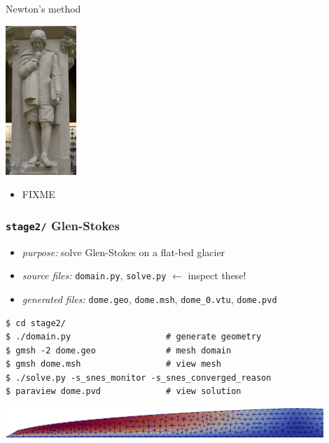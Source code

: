 \documentclass[10pt,hyperref,dvipsnames]{beamer}
\begin{document}
\begin{frame}{Newton's method}

\hfill \includegraphics[width=0.2\textwidth]{figs/people/inewton.jpg}

\vspace{-20mm}
\begin{itemize}
\item FIXME
\end{itemize}
\end{frame}


\begin{frame}[fragile]
\frametitle{\texttt{stage2/} \qquad Glen-Stokes}

\begin{itemize}
\item \emph{purpose:} solve Glen-Stokes on a flat-bed glacier
\item \emph{source files:} \texttt{domain.py}, \texttt{solve.py} \hfill \alert{$\gets$ inspect these!}
\item \emph{generated files:} \texttt{dome.geo}, \texttt{dome.msh}, \texttt{dome\_0.vtu}, \texttt{dome.pvd}
\end{itemize}

\bigskip
\begin{Verbatim}
$ cd stage2/
$ ./domain.py                   # generate geometry
$ gmsh -2 dome.geo              # mesh domain
$ gmsh dome.msh                 # view mesh
$ ./solve.py -s_snes_monitor -s_snes_converged_reason
$ paraview dome.pvd             # view solution
\end{Verbatim}

\vspace{10mm}
\begin{center}
\includegraphics[width=0.9\textwidth]{figs/stage2.png}
\end{center}
\end{frame}
\end{document}
